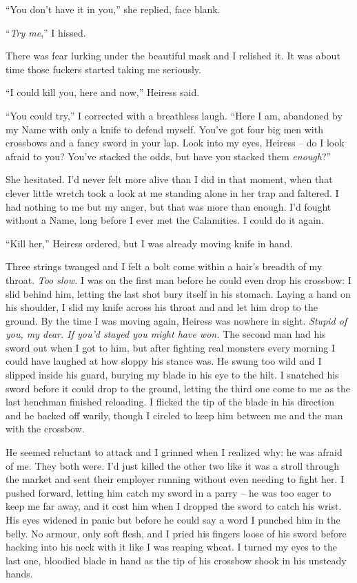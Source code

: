 \documentclass[12pt, openany]{book}
\begin{document}
“You don’t have it in you,” she replied, face blank.

“\textit{Try me},” I hissed.

There was fear lurking under the beautiful mask and I relished it. It was about time those fuckers started taking me seriously.

“I could kill you, here and now,” Heiress said.

“You could try,” I corrected with a breathless laugh. “Here I am, abandoned by my Name with only a knife to defend myself. You’ve got four big men with crossbows and a fancy sword in your lap. Look into my eyes, Heiress – do I look afraid to you? You’ve stacked the odds, but have you stacked them \textit{enough}?”

She hesitated. I’d never felt more alive than I did in that moment, when that clever little wretch took a look at me standing alone in her trap and faltered. I had nothing to me but my anger, but that was more than enough. I’d fought without a Name, long before I ever met the Calamities. I could do it again.

“Kill her,” Heiress ordered, but I was already moving knife in hand.

Three strings twanged and I felt a bolt come within a hair’s breadth of my throat. \textit{Too slow.} I was on the first man before he could even drop his crossbow: I slid behind him, letting the last shot bury itself in his stomach. Laying a hand on his shoulder, I slid my knife across his throat and and let him drop to the ground. By the time I was moving again, Heiress was nowhere in sight. \textit{Stupid of you, my dear. If you’d stayed you might have won.} The second man had his sword out when I got to him, but after fighting real monsters every morning I could have laughed at how sloppy his stance was. He swung too wild and I slipped inside his guard, burying my blade in his eye to the hilt. I snatched his sword before it could drop to the ground, letting the third one come to me as the last henchman finished reloading. I flicked the tip of the blade in his direction and he backed off warily, though I circled to keep him between me and the man with the crossbow. 

He seemed reluctant to attack and I grinned when I realized why: he was afraid of me. They both were. I’d just killed the other two like it was a stroll through the market and sent their employer running without even needing to fight her. I pushed forward, letting him catch my sword in a parry – he was too eager to keep me far away, and it cost him when I dropped the sword to catch his wrist. His eyes widened in panic but before he could say a word I punched him in the belly. No armour, only soft flesh, and I pried his fingers loose of his sword before hacking into his neck with it like I was reaping wheat. I turned my eyes to the last one, bloodied blade in hand as the tip of his crossbow shook in his unsteady hands.
\end{document}

